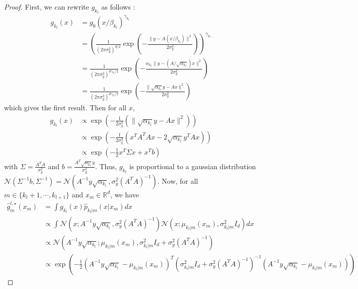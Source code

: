\documentclass[12pt]{article}
\begin{document}
\begin{proof}
    First, we can rewrite $g_{k_l}$ as follows :
    \begin{align*}
        g_{k_l}(x) 
        &= g_0(x/\beta_{k_l})^{\gamma_{k_l}} \\
        &= \left( \frac{1}{(2 \pi \sigma_y^2)^{d/2}} 
        \exp\left( -\frac{\| y - A (x/\beta_{k_l}) \|^2}{2 \sigma_y^2} \right) \right)^{\gamma_{k_l}} \\
        &= \frac{1}{(2 \pi \sigma_y^2)^{d \gamma_{k_l}/2}} 
        \exp\left( -\frac{\alpha_{k_l} \| y - (A/\sqrt{\alpha_{k_l}}) x \|^2}{2 \sigma_y^2} \right) \\
        &= \frac{1}{(2 \pi \sigma_y^2)^{d \gamma_{k_l}/2}} 
        \exp\left( -\frac{\| \sqrt{\alpha_{k_l}} y - A x \|^2}{2 \sigma_y^2} \right)
    \end{align*}
    which gives the first result.
    Then for all $x$, 
    \begin{align}
        g_{k_l}(x) 
        &\propto \exp( -\frac{1}{2 \sigma_y^2} ( \| \sqrt{\alpha_{k_l}} y - A x \|^2 ) ) \\
        &\propto \exp( -\frac{1}{2 \sigma_y^2} ( x^T A^T A x - 2 \sqrt{\alpha_{k_l}} y^T A x ) ) \\
        &\propto \exp( -\frac{1}{2} x^T \Sigma x + x^T b )
    \end{align}
    with $\Sigma = \frac{A^T A}{\sigma_y^2}$ and $b = \frac{A^T \sqrt{\alpha_{k_l}} y}{\sigma_y^2}$.
    Thus, $g_{k_l}$ is proportional to a gaussian distribution 
    $\mathcal{N}(\Sigma^{-1} b, \Sigma^{-1}) 
    = \mathcal{N}(A^{-1}y\sqrt{\alpha_{k_l}}, \sigma_y^2 (A^T A)^{-1})$.
    Now, for all $m \in \{k_l+1, \cdots, k_{l+1}\}$ and $x_m \in \mathbb{R}^d$, we have
    \begin{align*}
        \hat{g}_m^{l,\star} (x_m) 
        &= \int g_{k_l}(x) \hat{p}_{k_l|m}(x | x_m) dx \\
        &\propto \int \mathcal{N}\left(x;A^{-1}y\sqrt{\alpha_{k_l}}, \sigma_y^2 (A^T A)^{-1}\right)
        \mathcal{N}\left(x; \mu_{k_l|m}(x_m), \sigma_{k_l|m}^2 I_d\right) dx \\
        &\propto \mathcal{N}(A^{-1}y\sqrt{\alpha_{k_l}}; \mu_{k_l|m}(x_m), \sigma_{k_l|m}^2I_d + \sigma_y^2 (A^T A)^{-1}) \\
        &\propto \exp \left( -\frac{1}{2} (A^{-1}y\sqrt{\alpha_{k_l}} - \mu_{k_l|m}(x_m))^T 
        (\sigma_{k_l|m}^2I_d + \sigma_y^2 (A^T A)^{-1})^{-1}
        (A^{-1}y\sqrt{\alpha_{k_l}} - \mu_{k_l|m}(x_m)) \right)
    \end{align*}

\end{proof}
\end{document}
